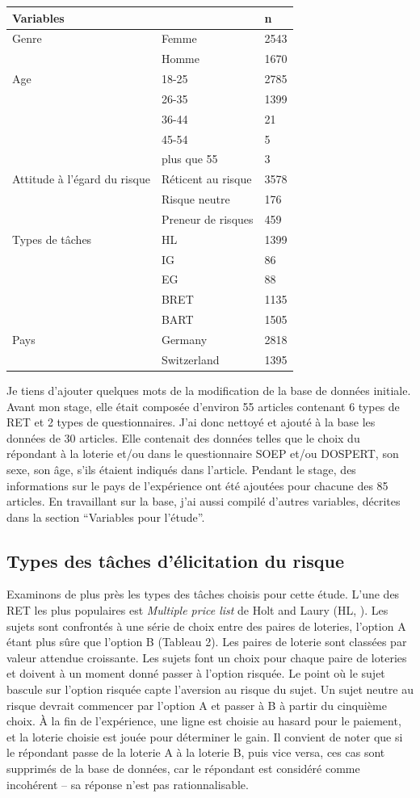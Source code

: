 \documentclass[12pt]{article}
\begin{document}
\begin{longtable}[]{@{}lll@{}}
\toprule()
Variables & & n \\
\midrule()
\endhead
Genre & Femme & 2543 \\
& Homme & 1670 \\
Age & 18-25 & 2785 \\
& 26-35 & 1399 \\
& 36-44 & 21 \\
& 45-54 & 5 \\
& plus que 55 & 3 \\
Attitude à l'égard du risque & Réticent au risque & 3578 \\
& Risque neutre & 176 \\
& Preneur de risques & 459 \\
Types de tâches & HL & 1399 \\
& IG & 86 \\
& EG & 88 \\
& BRET & 1135 \\
& BART & 1505 \\
Pays & Germany & 2818 \\
& Switzerland & 1395 \\
\bottomrule()
\end{longtable}

Je tiens d'ajouter quelques mots de la modification de la base de
données initiale. Avant mon stage, elle était composée d'environ 55
articles contenant 6 types de RET et 2 types de questionnaires. J'ai
donc nettoyé et ajouté à la base les données de 30 articles. Elle
contenait des données telles que le choix du répondant à la loterie
et/ou dans le questionnaire SOEP et/ou DOSPERT, son sexe, son âge, s'ils
étaient indiqués dans l'article. Pendant le stage, des informations sur
le pays de l'expérience ont été ajoutées pour chacune des 85 articles.
En travaillant sur la base, j'ai aussi compilé d'autres variables,
décrites dans la section ``Variables pour l'étude''.

\subsection{Types des tâches d'élicitation du risque}

Examinons de plus près les types des tâches choisis pour cette étude.
L'une des RET les plus populaires est \emph{Multiple price list} de Holt
and Laury (HL, \citet{Holt2002}). Les sujets sont confrontés à une série
de choix entre des paires de loteries, l'option A étant plus sûre que
l'option B (Tableau 2). Les paires de loterie sont classées par valeur
attendue croissante. Les sujets font un choix pour chaque paire de
loteries et doivent à un moment donné passer à l'option risquée. Le
point où le sujet bascule sur l'option risquée capte l'aversion au
risque du sujet. Un sujet neutre au risque devrait commencer par
l'option A et passer à B à partir du cinquième choix. À la fin de
l'expérience, une ligne est choisie au hasard pour le paiement, et la
loterie choisie est jouée pour déterminer le gain. Il convient de noter
que si le répondant passe de la loterie A à la loterie B, puis vice
versa, ces cas sont supprimés de la base de données, car le répondant
est considéré comme incohérent -- sa réponse n'est pas rationnalisable.
\end{document}
